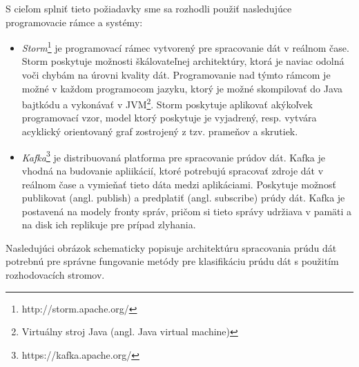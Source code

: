 S cieľom splniť tieto požiadavky sme sa rozhodli použiť nasledujúce programovacie rámce a systémy:
\begin{itemize}
	\item \textit{Storm}\footnote{http://storm.apache.org/} je programovací rámec vytvorený pre spracovanie dát v reálnom čase. Storm poskytuje možnosti škálovateľnej architektúry, ktorá je naviac odolná voči chybám na úrovni kvality dát. Programovanie nad týmto rámcom je možné v každom programocom jazyku, ktorý je možné skompilovať do Java bajtkódu a vykonávať v JVM\footnote{Virtuálny stroj Java (angl. Java virtual machine)}. Storm poskytuje aplikovať akýkoľvek programovací vzor, model ktorý poskytuje je vyjadrený, resp. vytvára acyklický orientovaný graf zostrojený z tzv. prameňov a skrutiek.
	\item \textit{Kafka}\footnote{https://kafka.apache.org/} je distribuovaná platforma pre spracovanie prúdov dát. Kafka je vhodná na budovanie apliikácií, ktoré potrebujú spracovať zdroje dát v reálnom čase a vymieňať tieto dáta medzi aplikáciami. Poskytuje možnosť publikovat (angl. publish) a predplatiť (angl. subscribe) prúdy dát. Kafka je postavená na modely fronty správ, pričom si tieto správy udržiava v pamäti a na disk ich replikuje pre prípad zlyhania.
\end{itemize}

Nasledujúci obrázok schematicky popisuje architektúru spracovania prúdu dát potrebnú pre správne fungovanie metódy pre klasifikáciu prúdu dát s použitím rozhodovacích stromov.
\label{fig:architecture}

